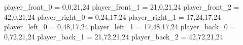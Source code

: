 player_front_0 = 0,0,21,24
player_front_1 = 21,0,21,24
player_front_2 = 42,0,21,24
player_right_0 = 0,24,17,24
player_right_1 = 17,24,17,24
player_left_0 = 0,48,17,24
player_left_1 = 17,48,17,24
player_back_0 = 0,72,21,24
player_back_1 = 21,72,21,24
player_back_2 = 42,72,21,24